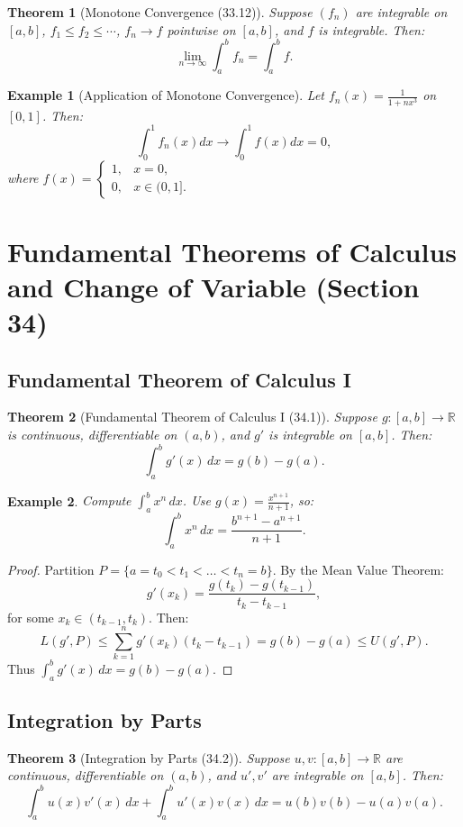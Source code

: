 \documentclass[9pt]{article}
\theoremstyle{definition}
\theoremstyle{plain}
\newtheorem{theorem}{Theorem}
\newtheorem{example}{Example}
\begin{document}
\begin{theorem}[Monotone Convergence (33.12)]
Suppose \( (f_n) \) are integrable on \( [a, b] \), \( f_1 \leq f_2 \leq \cdots \), \( f_n \to f \) pointwise on \( [a, b] \), and \( f \) is integrable. Then:
\[
\lim_{n \to \infty} \int_a^b f_n = \int_a^b f.
\]
\end{theorem}

\begin{example}[Application of Monotone Convergence]
Let \( f_n(x) = \frac{1}{1 + nx^3} \) on \( [0, 1] \). Then:
\[
\int_0^1 f_n(x) dx \to \int_0^1 f(x) dx = 0,
\]
where \( f(x) = \begin{cases} 1, & x = 0, \\ 0, & x \in (0, 1]. \end{cases} \)
\end{example}
\section*{Fundamental Theorems of Calculus and Change of Variable (Section 34)}

\subsection*{Fundamental Theorem of Calculus I}
\begin{theorem}[Fundamental Theorem of Calculus I (34.1)]
Suppose \( g : [a, b] \to \mathbb{R} \) is continuous, differentiable on \( (a, b) \), and \( g' \) is integrable on \( [a, b] \). Then:
\[
\int_a^b g'(x) \, dx = g(b) - g(a).
\]
\end{theorem}

\begin{example}
Compute \( \int_a^b x^n \, dx \). Use \( g(x) = \frac{x^{n+1}}{n+1} \), so:
\[
\int_a^b x^n \, dx = \frac{b^{n+1} - a^{n+1}}{n+1}.
\]
\end{example}

\begin{proof}
Partition \( P = \{a = t_0 < t_1 < \ldots < t_n = b\} \). By the Mean Value Theorem:
\[
g'(x_k) = \frac{g(t_k) - g(t_{k-1})}{t_k - t_{k-1}},
\]
for some \( x_k \in (t_{k-1}, t_k) \). Then:
\[
L(g', P) \leq \sum_{k=1}^n g'(x_k)(t_k - t_{k-1}) = g(b) - g(a) \leq U(g', P).
\]
Thus \( \int_a^b g'(x) \, dx = g(b) - g(a) \).
\end{proof}

\subsection*{Integration by Parts}
\begin{theorem}[Integration by Parts (34.2)]
Suppose \( u, v : [a, b] \to \mathbb{R} \) are continuous, differentiable on \( (a, b) \), and \( u', v' \) are integrable on \( [a, b] \). Then:
\[
\int_a^b u(x)v'(x) \, dx + \int_a^b u'(x)v(x) \, dx = u(b)v(b) - u(a)v(a).
\]
\end{theorem}
\end{document}
